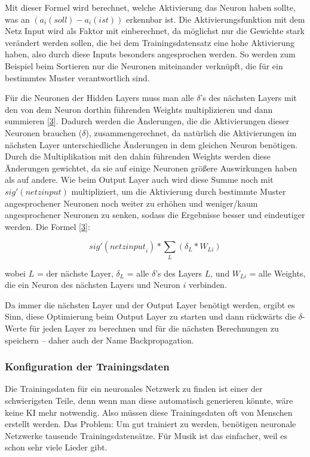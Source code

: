 \documentclass[11pt, a4paper, ngerman]{article}
\begin{document}
		Mit dieser Formel wird berechnet, welche Aktivierung das Neuron haben sollte, was an $(a_{i}(soll)-a_{i}(ist))$ erkennbar ist. Die Aktivierungsfunktion mit dem Netz Input wird als Faktor mit einberechnet, da möglichst nur die Gewichte stark verändert werden sollen, die bei dem Trainingsdatensatz eine hohe Aktivierung haben, also durch diese Inputs besonders angesprochen werden. So werden zum Beispiel beim Sortieren nur die Neuronen miteinander verknüpft, die für ein bestimmtes Muster verantwortlich sind.
		
		Für die Neuronen der Hidden Layers muss man alle $\delta$'s des nächsten Layers mit den von dem Neuron dorthin führenden Weights multiplizieren und dann summieren [\hyperref[src:3]{3}]. Dadurch werden die Änderungen, die die Aktivierungen dieser Neuronen brauchen ($\delta$), zusammengerechnet, da natürlich die Aktivierungen im nächsten Layer unterschiedliche Änderungen in dem gleichen Neuron benötigen. Durch die Multiplikation mit den dahin führenden Weights werden diese Änderungen gewichtet, da sie auf einige Neuronen größere Auswirkungen haben als auf andere. Wie beim Output Layer auch wird diese Summe noch mit $sig'(netzinput)$ multipliziert, um die Aktivierung durch bestimmte Muster angesprochener Neuronen noch weiter zu erhöhen und weniger/kaum angesprochener Neuronen zu senken, sodass die Ergebnisse besser und eindeutiger werden. Die Formel [\hyperref[src:3]{3}]:
		
		{\Large \[sig'({netzinput}_i) * \sum_{L}{\left(\delta_L\ast W_{Li}\right)}\]}
		
		\noindent wobei $L$ = der nächste Layer, $\delta_L$ = alle $\delta$'s des Layers $L$, und $W_{Li}$ = alle Weights, die ein Neuron des nächsten Layers und Neuron $i$ verbinden.
		
		Da immer die nächsten Layer und der Output Layer benötigt werden, ergibt es Sinn, diese Optimierung beim Output Layer zu starten und dann rückwärts die \mbox{$\delta$-Werte} für jeden Layer zu berechnen und für die nächsten Berechnungen zu speichern -- daher auch der Name Backpropagation.
		
		\subsubsection{Konfiguration der Trainingsdaten}
	Die Trainingsdaten für ein neuronales Netzwerk zu finden ist einer der schwierigsten Teile, denn wenn man diese automatisch generieren könnte, wäre keine KI mehr notwendig. Also müssen diese Trainingsdaten oft von Menschen erstellt werden. Das Problem: Um gut trainiert zu werden, benötigen neuronale Netzwerke tausende Trainingsdatensätze. Für Musik ist das einfacher, weil es schon sehr viele Lieder gibt.
\end{document}
